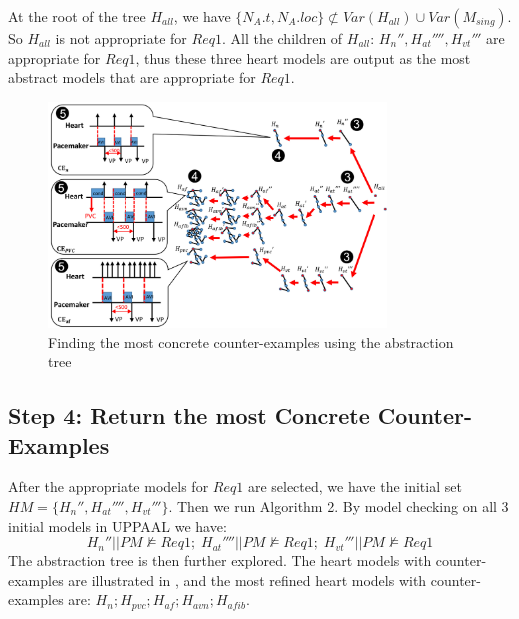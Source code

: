 At the root of the tree $H_{all}$, we have $\{N_A.t,N_A.loc\} \not \subset Var(H_{all})\cup Var(M_{sing})$. 
So $H_{all}$ is not appropriate for $Req1$. 
All the children of $H_{all}$: $H_n'',H_{at}'''',H_{vt}'''$ are appropriate for $Req1$,
thus these three heart models are output as the most abstract models that are appropriate for $Req1$.
\begin{figure}[!t]
	\centering
	\includegraphics[width=0.8\textwidth]{figs/abs_rev.pdf}
	\caption{\small Finding the most concrete counter-examples using the abstraction tree}
	\vspace{-10pt}
	\label{fig:CE}
\end{figure}
	\vspace{-10pt}
\subsection*{Step 4: Return the most Concrete Counter-Examples}
After the appropriate models for $Req1$ are selected, we have the initial set
$HM=\{H_n'',H_{at}'''',H_{vt}'''\}$.
Then we run Algorithm 2. By model checking on all 3 initial models in UPPAAL we have: 
$$H_n''||PM\not\models Req1;\; H_{at}''''||PM\not\models Req1;\; H_{vt}'''||PM\not\models Req1$$
The abstraction tree is then further explored. The heart models with counter-examples are illustrated in , and the most refined heart models with counter-examples are: $H_{n};H_{pvc};H_{af};H_{avn};H_{afib}$.

